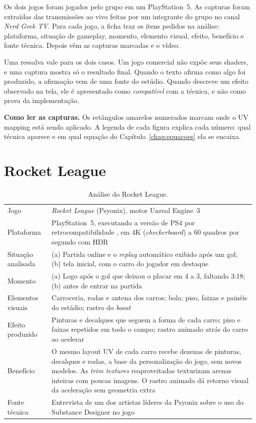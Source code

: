 
Os dois jogos foram jogados pelo grupo em um PlayStation~5. As capturas foram extraídas das transmissões ao vivo feitas por um integrante do grupo no canal \textit{Nerd Geek TV}. Para cada jogo, a ficha traz os itens pedidos na análise: plataforma, situação de gameplay, momento, elemento visual, efeito, benefício e fonte técnica. Depois vêm as capturas marcadas e o vídeo.

Uma ressalva vale para os dois casos. Um jogo comercial não expõe seus shaders, e uma captura mostra só o resultado final. Quando o texto afirma como algo foi produzido, a afirmação vem de uma fonte do estúdio. Quando descreve um efeito observado na tela, ele é apresentado como \textit{compatível} com a técnica, e não como prova da implementação.

\textbf{Como ler as capturas.} Os retângulos amarelos numerados marcam onde o UV mapping está sendo aplicado. A legenda de cada figura explica cada número: qual técnica aparece e em qual equação do Capítulo~\ref{chap:equacoes} ela se encaixa.

\section{Rocket League}

\begin{table}[H]
\centering
\caption{Análise do Rocket League.}
\label{tab:ficha-rl}
\small
\begin{tabular}{p{3.0cm}p{11.0cm}}
\toprule
Jogo & \textit{Rocket League} (Psyonix), motor Unreal Engine~3 \cite{substance} \\
Plataforma & PlayStation~5, executando a versão de PS4 por retrocompatibilidade \cite{rlstore}, em 4K (\textit{checkerboard}) a 60 quadros por segundo com HDR \cite{rlps5} \\
Situação analisada & (a) Partida online e o \textit{replay} automático exibido após um gol; (b) tela inicial, com o carro do jogador em destaque \\
Momento & (a) Logo após o gol que deixou o placar em 4 a 3, faltando 3:18; (b) antes de entrar na partida \\
Elementos visuais & Carroceria, rodas e antena dos carros; bola; piso, faixas e painéis do estádio; rastro do \textit{boost} \\
Efeito produzido & Pinturas e decalques que seguem a forma de cada carro; piso e faixas repetidos em todo o campo; rastro animado atrás do carro ao acelerar \\
Benefício & O mesmo layout UV de cada carro recebe dezenas de pinturas, decalques e rodas, a base da personalização do jogo, sem novos modelos. As \textit{trim textures} reaproveitadas texturizam arenas inteiras com poucas imagens. O rastro animado dá retorno visual da aceleração sem geometria extra \\
Fonte técnica & Entrevista de um dos artistas líderes da Psyonix sobre o uso do Substance Designer no jogo \cite{substance} \\
\bottomrule
\end{tabular}
\end{table}


